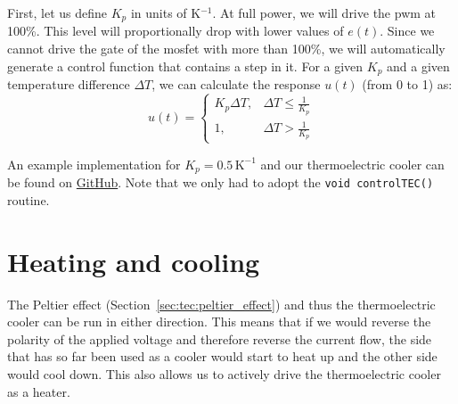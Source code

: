 First, let us define $K_p$ in units of K$^{-1}$. At full power, we will drive the \ac{pwm} at 100\%. This level will proportionally drop with lower values of $e(t)$. Since we cannot drive the gate of the \ac{mosfet} with more than 100\%, we will automatically generate a control function that contains a step in it. For a given $K_p$ and a given temperature difference $\Delta T$, we can calculate the response $u(t)$ (from 0 to 1) as:
\begin{equation}
  u(t) = \left\{ 
    \begin{array}{ll}
      K_p \Delta T,   & \Delta T \leq \frac{1}{K_p} \\
      1,              & \Delta T > \frac{1}{K_p}
    \end{array}
  \right.
\end{equation}

An example implementation for $K_p = 0.5\,\mathrm{K}^{-1}$ and our thermoelectric cooler can be found on \href{https://github.com/galactic-forensics/workshop_arduino_electronics/tree/main/further_examples/p_control}{GitHub}. Note that we only had to adopt the \lstinline{void controlTEC()} routine.




\section{Heating and cooling}

The Peltier effect (Section~\ref{sec:tec:peltier_effect}) and thus the thermoelectric cooler can be run in either direction. This means that if we would reverse the polarity of the applied voltage and therefore reverse the current flow, the side that has so far been used as a cooler would start to heat up and the other side would cool down. This also allows us to actively drive the thermoelectric cooler as a heater.

